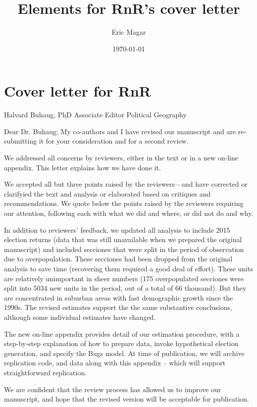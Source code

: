 \documentclass{article}
\author{Eric Magar}
\date{\today}
\title{Elements for RnR's cover letter}
\begin{document}
\maketitle
\tableofcontents


\section{Cover letter for RnR}
\label{sec:orgheadline1}
Halvard Buhaug, PhD
Associate Editor
Political Geography

Dear Dr. Buhaug: My co-authors and I have revised our manuscript and are re-submitting it for your consideration and for a second review. 

We addressed all concerns by reviewers, either in the text or in a new on-line appendix. This letter explains how we have done it. 

We accepted all but three points raised by the reviewers---and have corrected or clarifyied the text and analysis or elaborated based on critiques and recommendations. We quote below the points raised by the reviewers requiring our attention, following each with what we did and where, or did not do and why. 

In addition to reviewers' feedback, we updated all analysis to include 2015 election returns (data that was still unavailable when we prepared the original manuscript) and included secciones that were split in the period of observation due to overpopulation. These secciones had been dropped from the original analysis to save time (recovering them required a good deal of effort). These units are relatively unimportant in sheer numbers (175 overpopulated secciones were split into 5034 new units in the period, out of a total of 66 thousand). But they are concentrated in suburban areas with fast demographic growth since the 1990s. The revised estimates support the the same substantive conclusions, although some individual estimates have changed. 

The new on-line appendix provides detail of our estimation procedure, with a step-by-step explanation of how to prepare data, invoke hypothetical election generation, and specify the Bugs model. At time of publication, we will archive replication code, and data along with this appendix -- which will support straightforward replication.

We are confident that the review process has allowed us to improve our manuscript, and hope that the revised version will be acceptable for publication.
\end{document}
